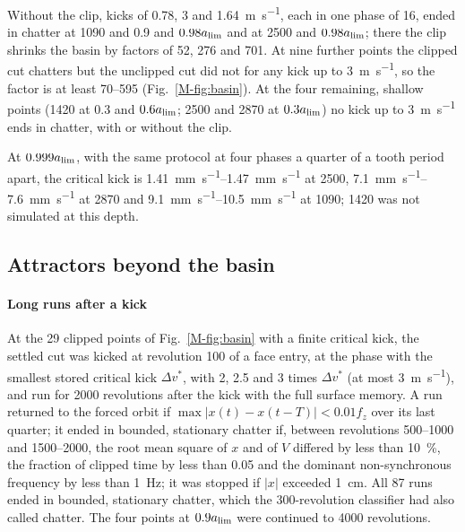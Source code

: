 Without the clip, kicks of 0.78, 3 and \SI{1.64}{\metre\per\second}, each in one phase of 16, ended in chatter at \SI{1090}{\rpm} and 0.9 and $0.98a_{\lim}$ and at \SI{2500}{\rpm} and $0.98a_{\lim}$; there the clip shrinks the basin by factors of 52, 276 and 701. At nine further points the clipped cut chatters but the unclipped cut did not for any kick up to \SI{3}{\metre\per\second}, so the factor is at least 70--595 (Fig.~\ref{M-fig:basin}). At the four remaining, shallow points (\SI{1420}{\rpm} at 0.3 and $0.6a_{\lim}$; 2500 and \SI{2870}{\rpm} at $0.3a_{\lim}$) no kick up to \SI{3}{\metre\per\second} ends in chatter, with or without the clip.

At $0.999a_{\lim}$, with the same protocol at four phases a quarter of a tooth period apart, the critical kick is \SIrange{1.41}{1.47}{\milli\metre\per\second} at \SI{2500}{\rpm}, \SIrange{7.1}{7.6}{\milli\metre\per\second} at \SI{2870}{\rpm} and \SIrange{9.1}{10.5}{\milli\metre\per\second} at \SI{1090}{\rpm}; \SI{1420}{\rpm} was not simulated at this depth.

\subsection{Attractors beyond the basin}\label{supp:bistab-attr}

\paragraph{Long runs after a kick} At the 29 clipped points of Fig.~\ref{M-fig:basin} with a finite critical kick, the settled cut was kicked at revolution 100 of a face entry, at the phase with the smallest stored critical kick $\Delta v^*$, with 2, 2.5 and 3 times $\Delta v^*$ (at most \SI{3}{\metre\per\second}), and run for 2000 revolutions after the kick with the full surface memory. A run returned to the forced orbit if $\max\lvert x(t)-x(t-T)\rvert<0.01f_z$ over its last quarter; it ended in bounded, stationary chatter if, between revolutions 500--1000 and 1500--2000, the root mean square of $x$ and of $V$ differed by less than \SI{10}{\percent}, the fraction of clipped time by less than 0.05 and the dominant non-synchronous frequency by less than \SI{1}{\hertz}; it was stopped if $\lvert x\rvert$ exceeded \SI{1}{\centi\metre}. All 87 runs ended in bounded, stationary chatter, which the 300-revolution classifier had also called chatter. The four points at $0.9a_{\lim}$ were continued to 4000 revolutions.

